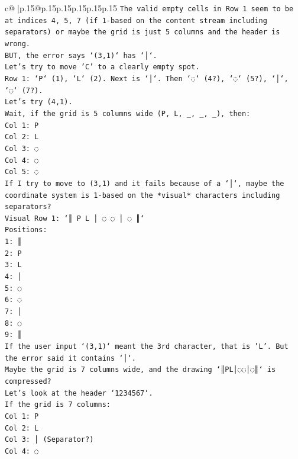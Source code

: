 \documentclass{article}
\begin{document}
{\begin{supertabular}{c@{$\;$}|p{.15\linewidth}@{}p{.15\linewidth}p{.15\linewidth}p{.15\linewidth}p{.15\linewidth}p{.15\linewidth}}
{{{\texttt{The valid empty cells in Row 1 seem to be at indices 4, 5, 7 (if 1{-}based on the content stream including separators) or maybe the grid is just 5 columns and the header is wrong.} \\
\texttt{BUT, the error says `(3,1)` has `│`.} \\
\texttt{Let's try to move 'C' to a clearly empty spot.} \\
\texttt{Row 1: `P` (1), `L` (2). Next is `│`. Then `◌` (4?), `◌` (5?), `│`, `◌` (7?).} \\
\texttt{Let's try (4,1).} \\
\texttt{Wait, if the grid is 5 columns wide (P, L, \_, \_, \_), then:} \\
\texttt{Col 1: P} \\
\texttt{Col 2: L} \\
\texttt{Col 3: ◌} \\
\texttt{Col 4: ◌} \\
\texttt{Col 5: ◌} \\
\texttt{If I try to move to (3,1) and it fails because of a `│`, maybe the coordinate system is 1{-}based on the *visual* characters including separators?} \\
\texttt{Visual Row 1: `║ P L │ ◌ ◌ │ ◌ ║`} \\
\texttt{Positions:} \\
\texttt{1: ║} \\
\texttt{2: P} \\
\texttt{3: L} \\
\texttt{4: │} \\
\texttt{5: ◌} \\
\texttt{6: ◌} \\
\texttt{7: │} \\
\texttt{8: ◌} \\
\texttt{9: ║} \\
\texttt{If the user input `(3,1)` meant the 3rd character, that is 'L'. But the error said it contains `│`.} \\
\texttt{Maybe the grid is 7 columns wide, and the drawing `║PL│◌◌│◌║` is compressed?} \\
\texttt{Let's look at the header `1234567`.} \\
\texttt{If the grid is 7 columns:} \\
\texttt{Col 1: P} \\
\texttt{Col 2: L} \\
\texttt{Col 3: │ (Separator?)} \\
\texttt{Col 4: ◌} \\
}}}
\end{supertabular}}
\end{document}

